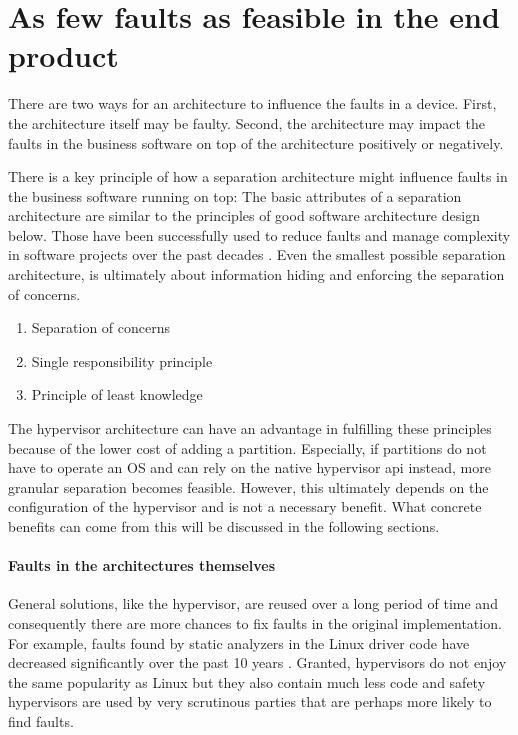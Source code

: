 
\section{As few faults as feasible in the end product}
There are two ways for an architecture to influence the faults in a device. First, the architecture itself may be faulty. Second, the architecture may impact the faults in the business software on top of the architecture positively or negatively.

There is a key principle of how a separation architecture might influence faults in the business software running on top: The basic attributes of a separation architecture are similar to the principles of good software architecture design below. Those have been successfully used to reduce faults and manage complexity in software projects over the past decades \cite{Randell.1996}\cite{martin2009clean}. Even the smallest possible separation architecture, is ultimately about information hiding and enforcing the separation of concerns.
\begin{enumerate}
\item Separation of concerns
\item Single responsibility principle
\item Principle of least knowledge
\end{enumerate}
The hypervisor architecture can have an advantage in fulfilling these principles because of the lower cost of adding a partition. Especially, if partitions do not have to operate an OS and can rely on the native hypervisor \acrshort{api} instead, more granular separation becomes feasible. However, this ultimately depends on the configuration of the hypervisor and is not a necessary benefit.
What concrete benefits can come from this will be discussed in the following sections.
\paragraph{Faults in the architectures themselves}
General solutions, like the hypervisor, are reused over a long period of time and consequently there are more chances to fix faults in the original implementation. For example, faults found by static analyzers in the Linux driver code have decreased significantly over the past 10 years \cite{palix2011faults}. Granted, hypervisors do not enjoy the same popularity as Linux but they also contain much less code and safety hypervisors are used by very scrutinous  parties that are perhaps more likely to find faults.


